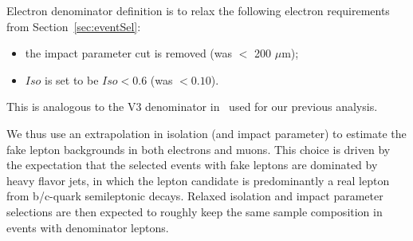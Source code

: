 Electron denominator definition is to relax the following electron requirements from
Section~\ref{sec:eventSel}:
\begin{itemize}
\item the impact parameter cut is removed (was $<$ 200 $\mu$m);
\item $Iso$ is set to be $Iso < 0.6$ (was $<0.10$).
\end{itemize}
This is analogous to the V3 denominator in~\cite{frmethod} used for our previous analysis.

We thus use an extrapolation  in isolation (and impact parameter) to estimate the fake lepton backgrounds 
in both electrons and muons.
This choice is driven by the expectation that the selected events with fake leptons are dominated by
heavy flavor jets, in which the lepton candidate is predominantly a real lepton from b/c-quark semileptonic decays.
Relaxed isolation and impact parameter selections are then expected to roughly keep the same sample
composition in events with denominator leptons.


